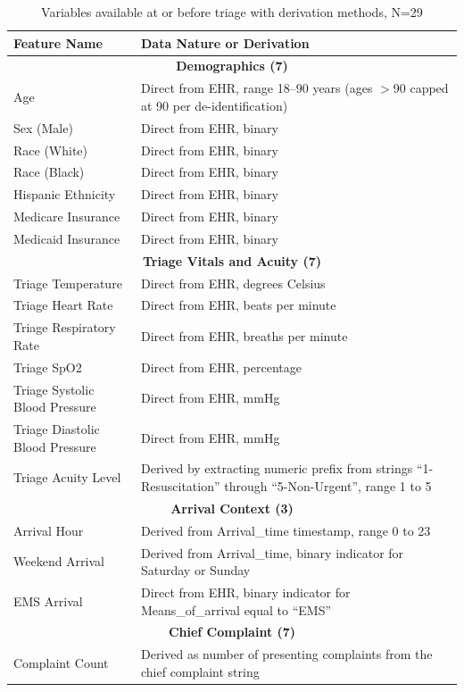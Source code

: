 \documentclass[harvard,article]{frontiersinFPHY_FAMS}
\begin{document}
\begin{table}[t]
\centering
\small
\caption{Variables available at or before triage with derivation methods, N=29}
\label{tab:features}
\begin{tabularx}{\textwidth}{@{}p{3.5cm} X@{}}
\toprule
\textbf{Feature Name} & \textbf{Data Nature or Derivation} \\
\midrule
\multicolumn{2}{c}{\textbf{Demographics (7)}} \\
\midrule
Age & Direct from EHR, range 18--90 years (ages $>$90 capped at 90 per de-identification) \\
Sex (Male) & Direct from EHR, binary \\
Race (White) & Direct from EHR, binary \\
Race (Black) & Direct from EHR, binary \\
Hispanic Ethnicity & Direct from EHR, binary \\
Medicare Insurance & Direct from EHR, binary \\
Medicaid Insurance & Direct from EHR, binary \\
\midrule
\multicolumn{2}{c}{\textbf{Triage Vitals and Acuity (7)}} \\
\midrule
Triage Temperature & Direct from EHR, degrees Celsius \\
Triage Heart Rate & Direct from EHR, beats per minute \\
Triage Respiratory Rate & Direct from EHR, breaths per minute \\
Triage SpO2 & Direct from EHR, percentage \\
Triage Systolic Blood Pressure & Direct from EHR, mmHg \\
Triage Diastolic Blood Pressure & Direct from EHR, mmHg \\
Triage Acuity Level & Derived by extracting numeric prefix from strings ``1-Resuscitation'' through ``5-Non-Urgent'', range 1 to 5 \\
\midrule
\multicolumn{2}{c}{\textbf{Arrival Context (3)}} \\
\midrule
Arrival Hour & Derived from Arrival\_time timestamp, range 0 to 23 \\
Weekend Arrival & Derived from Arrival\_time, binary indicator for Saturday or Sunday \\
EMS Arrival & Direct from EHR, binary indicator for Means\_of\_arrival equal to ``EMS'' \\
\midrule
\multicolumn{2}{c}{\textbf{Chief Complaint (7)}} \\
\midrule
Complaint Count & Derived as number of presenting complaints from the chief complaint string \\

\end{tabularx}
\end{table}
\end{document}
